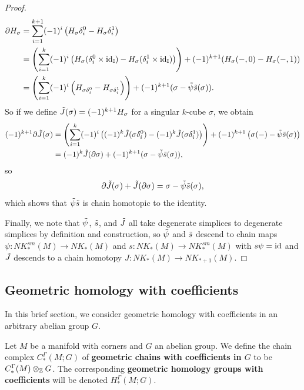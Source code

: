 \begin{proof}
	\begin{align*}
		\partial H_\sigma& = \sum_{i = 1}^{k+1} (-1)^i\left(H_\sigma \delta_i^0-H_\sigma \delta^1_i\right)\\
		& = \left(\sum_{i = 1}^{k} (-1)^i\left(H_\sigma (\delta_i^0 \times \mathrm{id}_{\mathbb{I}})-H_\sigma (\delta^1_i \times \mathrm{id}_{\mathbb{I}})\right)\right) +(-1)^{k+1}(H_\sigma(-,0)-H_\sigma(-,1))\\
		& = \left(\sum_{i = 1}^{k} (-1)^i\left(H_{\sigma \delta_i^0}-H_{\sigma\delta^1_i}\right)\right) +(-1)^{k+1}(\sigma -\tilde \psi\tilde s(\sigma)).
	\end{align*}
	So if we define $\tilde J(\sigma) = (-1)^{k+1}H_\sigma$ for a singular $k$-cube $\sigma$, we obtain
	\begin{align*}
		(-1)^{k+1}\partial \tilde J(\sigma)& = \left(\sum_{i = 1}^{k} (-1)^i\left( (-1)^k\tilde J(\sigma \delta_i^0)-(-1)^k\tilde J(\sigma\delta^1_i)\right)\right) +(-1)^{k+1}\left(\sigma(-)-\tilde \psi\tilde s(\sigma)\right)\\
		& = (-1)^k\tilde J(\partial \sigma)+(-1)^{k+1}(\sigma - \tilde \psi\tilde s(\sigma)),
	\end{align*}
	so $$\partial \tilde J(\sigma)+\tilde J(\partial \sigma) = \sigma - \tilde \psi\tilde s(\sigma),$$
	which shows that $\tilde \psi\tilde s$ is chain homotopic to the identity.

	Finally, we note that $\tilde \psi$, $\tilde s$, and $\tilde J$ all take degenerate simplices to degenerate simplices by definition and construction, so $\tilde \psi$ and $\tilde s$ descend to chain maps $\psi \colon NK_*^{sm}(M) \to NK_*(M)$ and $s \colon NK_*(M) \to NK_*^{sm}(M)$ with $s\psi = \mathrm{id}$ and $\tilde J$ descends to a chain homotopy $J \colon NK_*(M) \to NK_{*+1}(M)$.
\end{proof}

\subsection{Geometric homology with coefficients}\label{S: coefficients}

In this brief section, we consider geometric homology with coefficients in an arbitrary abelian group $G$.

\begin{definition}
	Let $M$ be a manifold with corners and $G$ an abelian group.
	We define the chain complex $C_*^\Gamma(M;G)$ of \textbf{geometric chains with coefficients in $G$} to be $C_*^\Gamma(M) \otimes_{\mathbb{Z}} G$.
	The corresponding \textbf{geometric homology groups with coefficients} will be denoted $H_*^\Gamma(M;G)$.
\end{definition}

